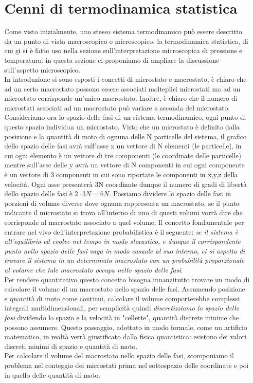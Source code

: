 \documentclass[10pt,a4paper]{article}
\begin{document}
\section{Cenni di termodinamica statistica}
Come visto inizialmente, uno stesso sistema termodinamico può essere descritto da un punto di vista macroscopico o microscopico, la termodinamica statistica, di cui gi si è fatto uso nella sezione sull'interpretazione microscopica di pressione e temperatura. in questa sezione ci proponiamo di ampliare la discussione sull'aspetto microscopico.\\
In introduzione si sono esposti i concetti di microstato e macrostato, è chiaro che ad un certo macrostato possono essere associati molteplici microstati ma ad un microstato corrisponde un'unico macrostato. Inoltre, è chiaro che il numero di microstati associati ad un macrostato può variare a seconda del microstato. Consideriamo ora lo spazio delle fasi di un sistema termodinamico, ogni punto di questo spazio individua un microstato. Visto che un microstato è definito dalla posizione e la quantità di moto di ognuna delle N particelle del sistema, il grafico dello spazio delle fasi avrà sull'asse x un vettore di N elementi (le particelle), in cui ogni elemento è un vettore di tre componenti (le coordinate delle particelle) mentre sull'asse delle y avrà un vettore di N componenti in cui ogni componente è un vettore di 3 componenti in cui sono riportate le componenti in x,y,z della velocità. Ogni asse presenterà 3N coordinate dunque il numero di gradi di libertà dello spazio delle fasi è \(2\cdot3N = 6N\). Possiamo dividere lo spazio delle fasi in porzioni di volume diverse dove ognuna rappresenta un macrostato, se il punto indicante il microstato si trova all'interno di uno di questi volumi vorrà dire che corrisponde al macrostato associato a quel volume. Il concetto fondamentale per entrare nel vivo dell'interpretazione probabilistica è il seguente:
\textit{se il sistema è all’equilibrio ed evolve nel tempo in modo stocastico, e dunque il corrispondente punto nello spazio delle fasi vaga in modo casuale al suo interno, ci si aspetta di trovare il sistema in un determinato macrostato con un probabilità proporzionale al volume che tale macrostato occupa nello spazio delle fasi}.\\
Per rendere quantitativo questo concetto bisogna innanzitutto trovare un modo di calcolare il volume di un macrostato nello spazio delle fasi. Assumendo posizione e quantità di moto come continui, calcolare il volume comporterebbe complessi integrali multidimensionali, per semplicità quindi \textit{discretizziamo lo spazio delle fasi} dividendo lo spazio e la velocità in "cellette", quantità discrete minime che possono assumere. Questo passaggio, adottato in modo formale, come un artificio matematico, in realtà verrà giustificato dalla fisica quantistica: esistono dei valori discreti minimi di spazio e quantità di moto.\\
Per calcolare il volume del macrostato nello spazio delle fasi, scomponiamo il problema nel conteggio dei microstati prima nel sottospazio delle coordinate e poi in quello delle quantità di moto. 
\end{document}
